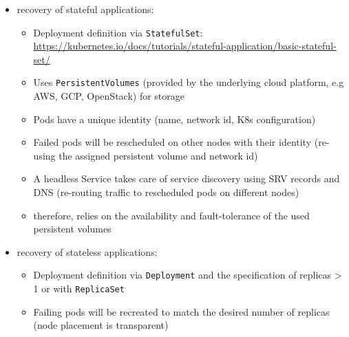 \begin{enumerate}
          \begin{itemize}
            \item recovery of stateful applications:
              \begin{itemize}
                \item Deployment definition via \texttt{StatefulSet}: \url{https://kubernetes.io/docs/tutorials/stateful-application/basic-stateful-set/}
                \item  Uses \texttt{PersistentVolumes} (provided by the underlying cloud platform, e.g AWS, GCP, OpenStack) for storage
                \item Pods have a unique identity (name, network id, K8s configuration)
                \item Failed pods will be rescheduled on other nodes with their identity (re-using the assigned persistent volume and network id)
                \item A headless Service takes care of service discovery using SRV records and DNS (re-routing traffic to rescheduled pods on different nodes)
                \item therefore, relies on the availability and fault-tolerance of the used persistent volumes
              \end{itemize}

            \item recovery of stateless applications:
              \begin{itemize}
                \item Deployment definition via \texttt{Deployment} and the specification of replicas > 1 or with \texttt{ReplicaSet}
                \item Failing pods will be recreated to match the desired number of replicas (node placement is transparent)
              \end{itemize}


\end{itemize}
\end{enumerate}
